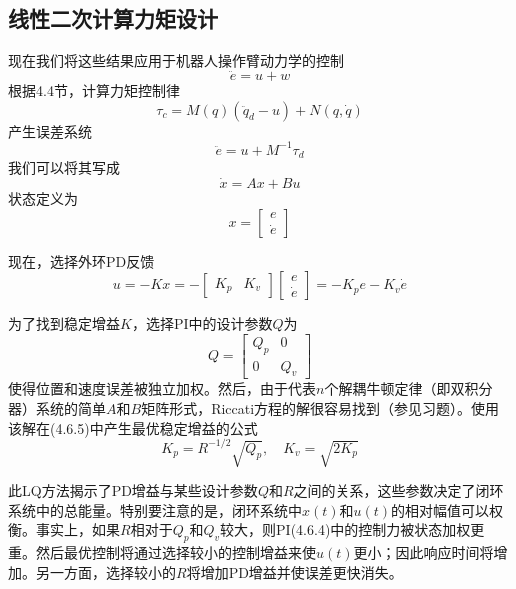 \documentclass[UTF8]{ctexart}
\theoremstyle{definition}
\begin{document}
\subsection{线性二次计算力矩设计}

现在我们将这些结果应用于机器人操作臂动力学的控制
\begin{equation}
    \ddot{e} = u + w
\end{equation}
根据4.4节，计算力矩控制律
\begin{equation}
    \tau_c = M(q)(\ddot{q}_d - u) + N(q, \dot{q})
\end{equation}
产生误差系统
\begin{equation}
    \ddot{e} = u + M^{-1}\tau_d
\end{equation}
我们可以将其写成
\begin{equation}
    \dot{x} = Ax + Bu
\end{equation}
状态定义为
\begin{equation}
    x = \begin{bmatrix} e \\ \dot{e} \end{bmatrix}
\end{equation}

现在，选择外环PD反馈
\begin{equation}
    u = -Kx = -\begin{bmatrix} K_p & K_v \end{bmatrix}\begin{bmatrix} e \\ \dot{e} \end{bmatrix} = -K_pe - K_v\dot{e}
\end{equation}

为了找到稳定增益$K$，选择PI中的设计参数$Q$为
\begin{equation}
    Q = \begin{bmatrix} Q_p & 0 \\ 0 & Q_v \end{bmatrix}
\end{equation}
使得位置和速度误差被独立加权。然后，由于代表$n$个解耦牛顿定律（即双积分器）系统的简单$A$和$B$矩阵形式，Riccati方程的解很容易找到（参见习题）。使用该解在(4.6.5)中产生最优稳定增益的公式
\begin{equation}
    K_p = R^{-1/2}\sqrt{Q_p}, \quad K_v = \sqrt{2K_p}
\end{equation}

此LQ方法揭示了PD增益与某些设计参数$Q$和$R$之间的关系，这些参数决定了闭环系统中的总能量。特别要注意的是，闭环系统中$x(t)$和$u(t)$的相对幅值可以权衡。事实上，如果$R$相对于$Q_p$和$Q_v$较大，则PI(4.6.4)中的控制力被状态加权更重。然后最优控制将通过选择较小的控制增益来使$u(t)$更小；因此响应时间将增加。另一方面，选择较小的$R$将增加PD增益并使误差更快消失。
\end{document}
